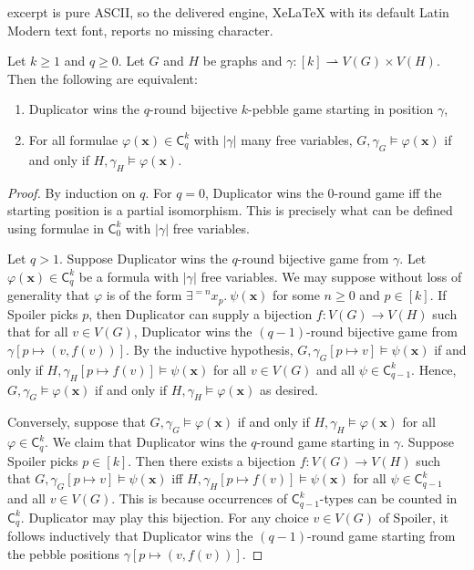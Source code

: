 \documentclass[10pt,a4paper]{amsart}
\renewcommand\phi\varphi
\begin{document}
excerpt is pure ASCII, so the delivered engine, XeLaTeX with its default Latin Modern text font, reports no missing character.
\begin{thm} \label{thm:hella}
	Let $k\geq 1$ and $q \geq 0$.
	Let $G$ and $H$ be graphs and $\gamma \colon [k] \rightharpoonup V(G) \times V(H)$.
	Then the following are equivalent:
	\begin{enumerate}
		\item Duplicator wins the $q$-round bijective $k$-pebble game starting in position $\gamma$,
		\item For all formulae $\phi(\boldsymbol{x}) \in \mathsf{C}^k_q$ with $|\gamma|$ many free variables, $G, \gamma_G \models \phi(\boldsymbol{x})$ if and only if $H, \gamma_H \models \phi(\boldsymbol{x})$.
	\end{enumerate}
\end{thm}

\begin{proof}
	By induction on $q$.
	For $q = 0$, Duplicator wins the $0$-round game iff the starting position is a partial isomorphism.
	This is precisely what can be defined using formulae in $\mathsf{C}^{k}_0$ with $|\gamma|$ free variables.
	
	Let $q > 1$.
	Suppose Duplicator wins the $q$-round bijective game from $\gamma$.
	Let $\phi(\boldsymbol{x}) \in \mathsf{C}^k_q$ be a formula with $|\gamma|$ free variables.
	We may suppose without loss of generality that $\phi$ is of the form $\exists^{=n} x_p.\ \psi(\boldsymbol{x})$ for some $n \geq 0$ and $p \in [k]$.
	If Spoiler picks $p$, then Duplicator can supply a bijection $f \colon V(G) \to V(H)$ such that for all $v \in V(G)$, Duplicator wins the $(q-1)$-round bijective game from $\gamma[p \mapsto (v, f(v))]$.
	By the inductive hypothesis, $G, \gamma_G[p \mapsto v] \models \psi(\boldsymbol{x})$ if and only if $H, \gamma_H[p \mapsto f(v)] \models \psi(\boldsymbol{x})$ for all $v \in V(G)$ and all $\psi \in \mathsf{C}^k_{q-1}$.
	Hence, $G, \gamma_G \models \phi(\boldsymbol{x})$ if and only if $H,\gamma_H \models \phi(\boldsymbol{x})$ as desired.
	
	Conversely, suppose that $G, \gamma_G \models \phi(\boldsymbol{x})$ if and only if $H, \gamma_H \models \phi(\boldsymbol{x})$ for all $\phi \in \mathsf{C}^k_q$.
	We claim that Duplicator wins the $q$-round game starting in $\gamma$.
	Suppose Spoiler picks $p \in [k]$.
	Then there exists a bijection $f \colon V(G) \to V(H)$ such that $G, \gamma_G[p \mapsto v] \models \psi(\boldsymbol{x})$ iff $H, \gamma_H[p \mapsto f(v)] \models \psi(\boldsymbol{x})$ for all $\psi \in \mathsf{C}^k_{q-1}$ and all $v \in V(G)$.
	This is because occurrences of $\mathsf{C}^k_{q-1}$-types can be counted in $\mathsf{C}^k_q$.
	Duplicator may play this bijection.
	For any choice $v \in V(G)$ of Spoiler, it follows inductively that Duplicator wins the $(q-1)$-round game starting from the pebble positions $\gamma[p \mapsto (v, f(v))]$.
\end{proof}
\end{document}
